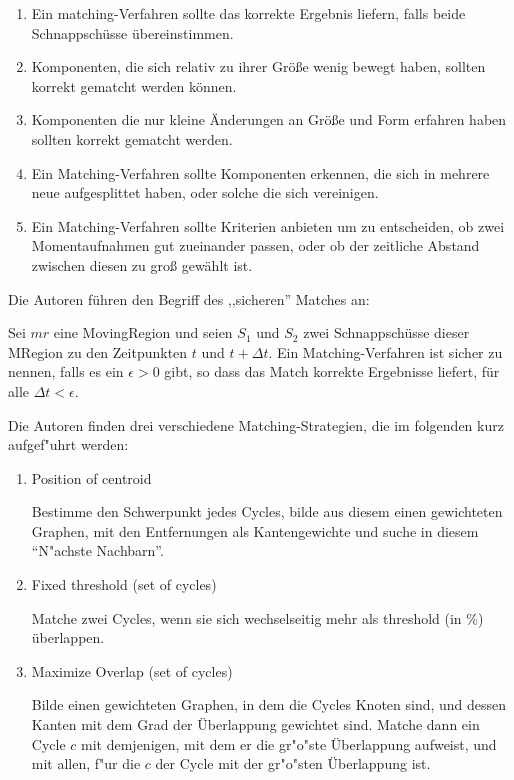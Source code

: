 \begin{enumerate}
\item Ein matching-Verfahren sollte das korrekte Ergebnis liefern, falls beide Schnappschüsse übereinstimmen.
\item Komponenten, die sich relativ zu ihrer Größe wenig bewegt haben, sollten korrekt gematcht werden können.
\item Komponenten die nur kleine Änderungen an Größe und Form erfahren haben sollten korrekt gematcht werden.
\item Ein Matching-Verfahren sollte Komponenten erkennen, die sich in mehrere neue aufgesplittet haben, oder solche die sich vereinigen.
\item Ein Matching-Verfahren sollte Kriterien anbieten um zu entscheiden, ob zwei Momentaufnahmen gut zueinander passen, oder ob der zeitliche Abstand zwischen diesen zu groß gewählt ist.
\end{enumerate}

Die Autoren führen den Begriff des ,,sicheren'' Matches an:

Sei $mr$ eine MovingRegion und seien $S_1$ und $S_2$ zwei Schnappschüsse dieser MRegion zu den Zeitpunkten $t$ und $t+\Delta t$. Ein Matching-Verfahren ist sicher zu nennen, falls es ein $\epsilon >0$ gibt, so dass das Match korrekte Ergebnisse liefert, für alle $\Delta t < \epsilon$.

Die Autoren finden drei verschiedene Matching-Strategien, die im folgenden kurz aufgef"uhrt werden:
\begin{enumerate}
\item Position of centroid \label{MatchSchwer}

Bestimme den Schwerpunkt jedes Cycles,  bilde aus diesem einen gewichteten Graphen, mit den Entfernungen als Kantengewichte und suche in diesem "`N"achste Nachbarn"'.
\item Fixed threshold (set of cycles)\label{fixedThre}

Matche zwei Cycles, wenn sie sich wechselseitig  mehr als threshold (in \%) überlappen.

\item Maximize Overlap (set of cycles)

Bilde einen gewichteten Graphen, in dem die Cycles Knoten sind, und dessen Kanten mit dem Grad der Überlappung gewichtet sind. Matche dann ein Cycle $c$ mit demjenigen, mit dem er die gr"o"ste Überlappung aufweist, und mit allen, f"ur die $c$ der Cycle mit der gr"o"sten Überlappung ist.
\end{enumerate} 

